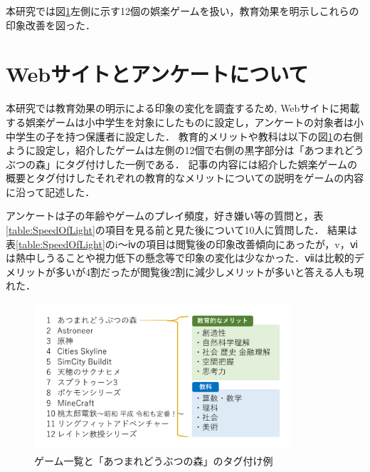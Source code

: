 \documentclass[twocolumn,10pt,a4j]{ltjsarticle}
\begin{document}
本研究では図\ref{fig:ゲーム一覧}左側に示す12個の娯楽ゲームを扱い，教育効果を明示しこれらの印象改善を図った．



\section{Webサイトとアンケートについて}
本研究では教育効果の明示による印象の変化を調査するため, Webサイトに掲載する娯楽ゲームは小中学生を対象にしたものに設定し，アンケートの対象者は小中学生の子を持つ保護者に設定した．
教育的メリットや教科は以下の図\ref{fig:ゲーム一覧}の右側ように設定し，紹介したゲームは左側の12個で右側の黒字部分は「あつまれどうぶつの森」にタグ付けした一例である．
記事の内容には紹介した娯楽ゲームの概要とタグ付けしたそれぞれの教育的なメリットについての説明をゲームの内容に沿って記述した．

アンケートは子の年齢やゲームのプレイ頻度，好き嫌い等の質問と，表\ref{table:SpeedOfLight}の項目を見る前と見た後について10人に質問した．
結果は表\ref{table:SpeedOfLight}のi～ⅳの項目は閲覧後の印象改善傾向にあったが，v，ⅵは熱中しうることや視力低下の懸念等で印象の変化は少なかった．ⅶは比較的デメリットが多いが4割だったが閲覧後2割に減少しメリットが多いと答える人も現れた．
\vspace{1zh}
\begin{figure}[h]
 \begin{center}
  \includegraphics[clip,width=95mm,height=55mm]{games.pdf}
 \end{center}
 \caption{ゲーム一覧と「あつまれどうぶつの森」のタグ付け例}
 \label{fig:ゲーム一覧}
\end{figure}
\end{document}
